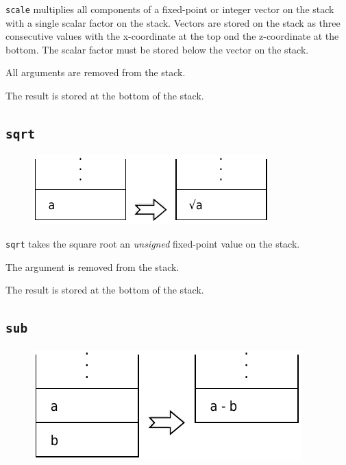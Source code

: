 			\texttt{scale} multiplies all components of a fixed-point or
			integer vector on the stack with a single scalar factor on the
			stack. Vectors are stored on the stack as three consecutive values
			with the x-coordinate at the top ond the z-coordinate at the
			bottom. The scalar factor must be stored below the vector on the
			stack.
			
			All arguments are removed from the stack.
			
			The result is stored at the bottom of the stack.
	
	\qquad
	
	\subsection*{\texttt{sqrt}}
	
		\begin{figure}
			\begin{flushright}
				\includegraphics[width=\linewidth]{figure/pdf/i_sqrt} 
			\end{flushright}
		\end{figure}
	
			\texttt{sqrt} takes the square root an \emph{unsigned} fixed-point
			value on the stack.
			
			The argument is removed from the stack.
			
			The result is stored at the bottom of the stack.
	
	\qquad
	
	\subsection*{\texttt{sub}}
	
		\begin{figure}
			\begin{flushright}
				\includegraphics[width=\linewidth]{figure/pdf/i_sub} 
			\end{flushright}
		\end{figure}
	

